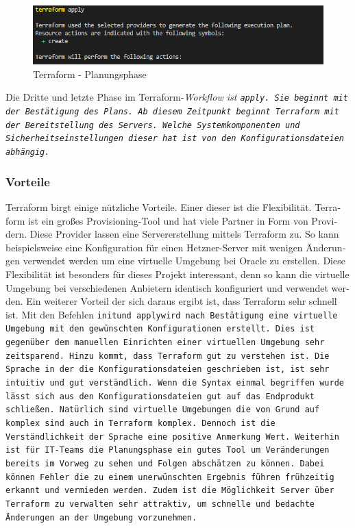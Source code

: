 \begin{otherlanguage}{ngerman}
\newline
\begin{figure}[h]
    \centering
    \includegraphics{LaTeX/graphic/terraformapply.png}
    \caption{Terraform - Planungsphase}
\end{figure}
\newline 
 
Die Dritte und letzte Phase im Terraform-\it Workflow \rm ist \tt apply\rm. Sie beginnt mit der Bestätigung des Plans. Ab diesem Zeitpunkt beginnt Terraform mit der Bereitstellung des Servers. Welche Systemkomponenten und Sicherheitseinstellungen dieser hat ist von den Konfigurationsdateien abhängig. 

\subsubsection{Vorteile}
Terraform birgt einige nützliche Vorteile. Einer dieser ist die Flexibilität. Terraform ist ein großes Provisioning-Tool und hat viele Partner in Form von Providern. Diese Provider lassen eine Servererstellung mittels Terraform zu. So kann beispielsweise eine Konfiguration für einen Hetzner-Server mit wenigen Änderungen verwendet werden um eine virtuelle Umgebung bei \dq Oracle \dq{} zu erstellen. Diese Flexibilität ist besonders für dieses Projekt interessant, denn so kann die virtuelle Umgebung bei verschiedenen Anbietern identisch konfiguriert und verwendet werden. 
\newline 
Ein weiterer Vorteil der sich daraus ergibt ist, dass Terraform sehr schnell ist. Mit den Befehlen \tt init\rm und \tt apply\rm wird nach Bestätigung eine virtuelle Umgebung mit den gewünschten Konfigurationen erstellt. Dies ist gegenüber dem manuellen Einrichten einer virtuellen Umgebung sehr zeitsparend. 
\newline
Hinzu kommt, dass Terraform gut zu verstehen ist. Die Sprache in der die Konfigurationsdateien geschrieben ist, ist sehr intuitiv und gut verständlich. Wenn die Syntax einmal begriffen wurde lässt sich aus den Konfigurationsdateien gut auf das Endprodukt schließen. Natürlich sind virtuelle Umgebungen die von Grund auf komplex sind auch in Terraform komplex. Dennoch ist die Verständlichkeit der Sprache eine positive Anmerkung Wert.
\newline
Weiterhin ist für IT-Teams die Planungsphase ein gutes Tool um Veränderungen bereits im Vorweg zu sehen und Folgen abschätzen zu können. Dabei können Fehler die zu einem unerwünschten Ergebnis führen frühzeitig erkannt und vermieden werden. Zudem ist die Möglichkeit Server über Terraform zu verwalten sehr attraktiv, um schnelle und bedachte Änderungen an der Umgebung vorzunehmen.
\end{otherlanguage}